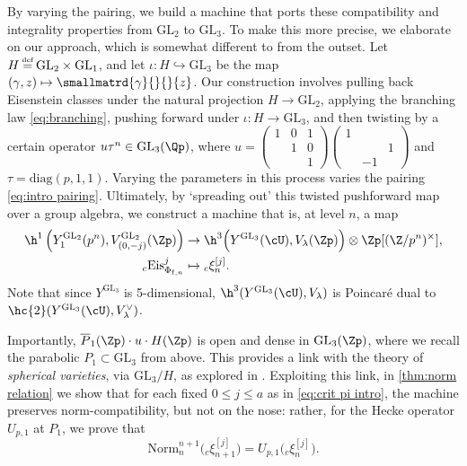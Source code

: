 \documentclass[10pt,reqno,a4paper]{amsart}
\newcommand{\GL}{\mathrm{GL}}
\newcommand{\smallthreemat}[9]{\left(\begin{smallmatrix}
#1 & #2 & #3 \\
#4 & #5 & #6 \\
#7 & #8 & #9\end{smallmatrix}\right)}
\begin{document}
By varying the pairing, we build a machine that ports these compatibility and integrality properties from $\GL_2$ to $\GL_3$. To make this more precise, we elaborate on our approach, which is somewhat different to \cite{Mah98} from the outset. Let $H\defeq \GL_2\times \GL_1$, and let $\iota : H \hookrightarrow \GL_3$ be the map $(\gamma,z) \mapsto \smallmatrd{\gamma}{}{}{z}$. Our construction involves pulling back Eisenstein classes under the natural projection $H \to \GL_2$, applying the branching law \eqref{eq:branching}, pushing forward under $\iota : H \to \GL_3$, and then twisting by a certain operator $u\tau^n \in \GL_3(\Qp)$, where $u = \smallthreemat{1}{0}{1}{}{1}{0}{}{}{1}\smallthreemat{1}{}{}{}{}{1}{}{-1}{}$ and $\tau = \mathrm{diag}(p,1,1)$. Varying the parameters in this process varies the pairing \eqref{eq:intro pairing}. Ultimately, by `spreading out' this twisted pushforward map over a group algebra, we construct a machine that is, at level $n$, a map
\begin{align*}
\h^1\left(Y^{\GL_2}_1(p^n),V_{(0,-j)}^{\GL_2}(\Zp)\right) &\to \h^3\Big(Y^{\GL_3}(\cU),V_\lambda(\Zp)\Big) \otimes \Zp[(\Z/p^n)^\times],\\
{}_c\mathrm{Eis}^{j}_{\Phi_{\mathrm{f},n}} &\mapsto {}_c\xi_n^{[j]}.
\end{align*}
Note that since $Y^{\GL_3}$ is 5-dimensional, $\h^3(Y^{\GL_3}(\cU),V_\lambda)$ is Poincar\'e dual to $\hc{2}(Y^{\GL_3}(\cU),V_\lambda^\vee)$.


Importantly, $\overline{P}_1(\Zp) \cdot u \cdot H(\Zp)$ is open and dense in $\GL_3(\Zp)$, where we recall the parabolic $P_1 \subset \GL_3$ from above. This provides a link with the theory of \emph{spherical varieties}, via $\GL_3/H$, as explored in \cite{loeffler-parabolics}. Exploiting this link, in \cref{thm:norm relation} we show that for each fixed $0 \leq j \leq a$ as in \eqref{eq:crit pi intro}, the machine preserves norm-compatibility, but not on the nose: rather, for the Hecke operator $U_{p,1}$ at $P_1$, we prove that
\[
\mathrm{Norm}^{n+1}_n\big({}_c\xi_{n+1}^{[j]}\big) = U_{p,1} \big( {}_c\xi_n^{[j]}\big).
\]
\end{document}
